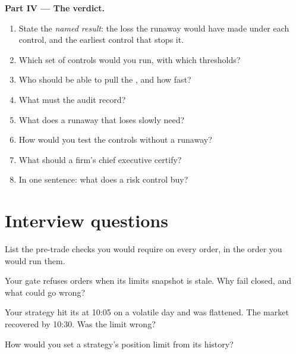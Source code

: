 \begin{problem}
\medskip\noindent\textbf{Part IV --- The verdict.}
\begin{enumerate}[resume]
\item State the \emph{named result}: the loss the runaway would have made under each control, and the earliest control that stops it.
\item Which set of controls would you run, with which thresholds?
\item Who should be able to pull the , and how fast?
\item What must the audit record?
\item What does a runaway that loses slowly need?
\item How would you test the controls without a runaway?
\item What should a firm's chief executive certify?
\item In one sentence: what does a risk control buy?
\end{enumerate}
\end{problem}

\section{Interview questions}

\begin{interviewq}\label{iq:hf:risk-controls:1}
List the pre-trade checks you would require on every order, in the order you would run them.
\end{interviewq}

\begin{interviewq}\label{iq:hf:risk-controls:2}
Your gate refuses orders when its limits snapshot is stale. Why fail closed, and what could go wrong?
\end{interviewq}

\begin{interviewq}\label{iq:hf:risk-controls:3}
Your strategy hit its  at 10:05 on a volatile day and was flattened. The market recovered by 10:30. Was the limit wrong?
\end{interviewq}

\begin{interviewq}\label{iq:hf:risk-controls:4}
How would you set a strategy's position limit from its history?
\end{interviewq}

